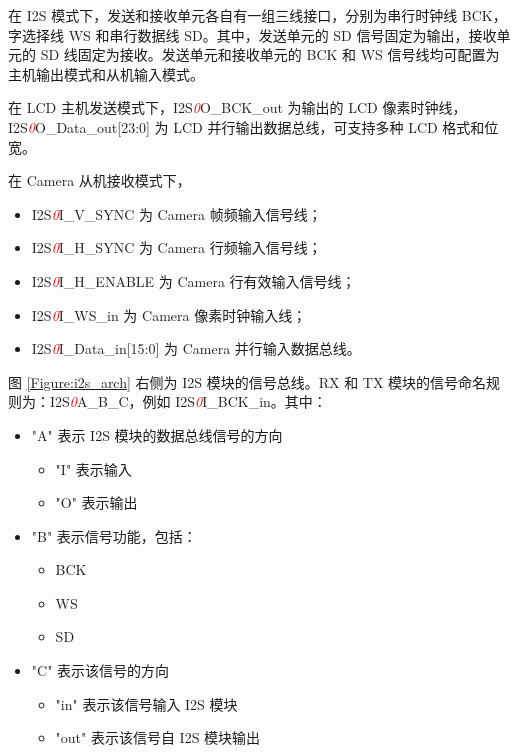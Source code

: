 \documentclass[main\_\_CN.tex]{subfiles}
\begin{document}
在 I2S 模式下，发送和接收单元各自有一组三线接口，分别为串行时钟线 BCK，字选择线 WS 和串行数据线 SD。其中，发送单元的 SD 信号固定为输出，接收单元的 SD 线固定为接收。发送单元和接收单元的 BCK 和 WS 信号线均可配置为主机输出模式和从机输入模式。

在 LCD 主机发送模式下，I2S\textcolor{red}{\it{0}}O\_BCK\_out 为输出的 LCD 像素时钟线，I2S\textcolor{red}{\it{0}}O\_Data\_out[23:0] 为 LCD 并行输出数据总线，可支持多种 LCD 格式和位宽。

在 Camera 从机接收模式下，
\begin{itemize}
\item I2S\textcolor{red}{\it{0}}I\_V\_SYNC 为 Camera 帧频输入信号线；
\item I2S\textcolor{red}{\it{0}}I\_H\_SYNC 为 Camera 行频输入信号线；
\item I2S\textcolor{red}{\it{0}}I\_H\_ENABLE 为 Camera 行有效输入信号线；
\item I2S\textcolor{red}{\it{0}}I\_WS\_in 为 Camera 像素时钟输入线；
\item I2S\textcolor{red}{\it{0}}I\_Data\_in[15:0] 为 Camera 并行输入数据总线。
\end{itemize}

图 \ref{Figure:i2s_arch} 右侧为 I2S 模块的信号总线。RX 和 TX 模块的信号命名规则为：I2S\textcolor{red}{\it{0}}A\_B\_C，例如 I2S\textcolor{red}{\it{0}}I\_BCK\_in。其中：

\begin{itemize}
    \item "A" 表示 I2S 模块的数据总线信号的方向
    \begin{itemize}
        \item "I" 表示输入
        \item "O" 表示输出
    \end{itemize}
    \item "B" 表示信号功能，包括：
    \begin{itemize}
        \item BCK
        \item WS
        \item SD
    \end{itemize}
    \item "C" 表示该信号的方向
    \begin{itemize}
        \item "in" 表示该信号输入 I2S 模块
        \item "out" 表示该信号自 I2S 模块输出
    \end{itemize}
\end{itemize}
\end{document}
